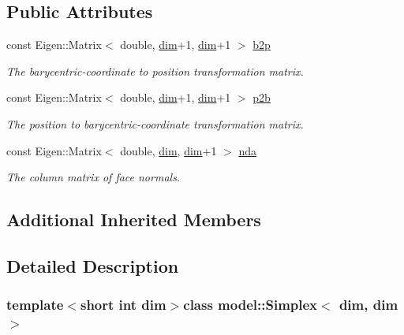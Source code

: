 \subsection*{Public Attributes}
\begin{DoxyCompactItemize}
\item 
const Eigen\+::\+Matrix$<$ double, \hyperlink{plot_nd_a_8m_a382f3ca768b275b8d563604f7fc7df73}{dim}+1, \hyperlink{plot_nd_a_8m_a382f3ca768b275b8d563604f7fc7df73}{dim}+1 $>$ \hyperlink{classmodel_1_1_simplex_3_01dim_00_01dim_01_4_afd104749bc0e9df7c6fd969ad4548fa1}{b2p}
\begin{DoxyCompactList}\small\item\em The barycentric-\/coordinate to position transformation matrix. \end{DoxyCompactList}\item 
const Eigen\+::\+Matrix$<$ double, \hyperlink{plot_nd_a_8m_a382f3ca768b275b8d563604f7fc7df73}{dim}+1, \hyperlink{plot_nd_a_8m_a382f3ca768b275b8d563604f7fc7df73}{dim}+1 $>$ \hyperlink{classmodel_1_1_simplex_3_01dim_00_01dim_01_4_ad48b9fd57ece3ea832b3a354a62bfbf2}{p2b}
\begin{DoxyCompactList}\small\item\em The position to barycentric-\/coordinate transformation matrix. \end{DoxyCompactList}\item 
const Eigen\+::\+Matrix$<$ double, \hyperlink{plot_nd_a_8m_a382f3ca768b275b8d563604f7fc7df73}{dim}, \hyperlink{plot_nd_a_8m_a382f3ca768b275b8d563604f7fc7df73}{dim}+1 $>$ \hyperlink{classmodel_1_1_simplex_3_01dim_00_01dim_01_4_abffa018e3a93369d19afa43217aa8cba}{nda}
\begin{DoxyCompactList}\small\item\em The column matrix of face normals. \end{DoxyCompactList}\end{DoxyCompactItemize}
\subsection*{Additional Inherited Members}


\subsection{Detailed Description}
\subsubsection*{template$<$short int dim$>$class model\+::\+Simplex$<$ dim, dim $>$}



